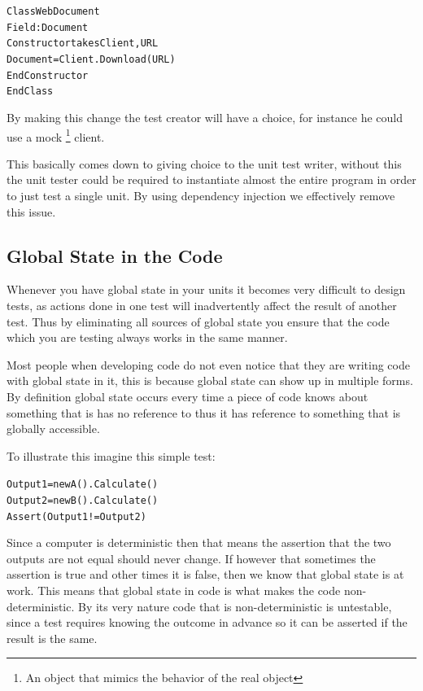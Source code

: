 \begin{alltt}
Class WebDocument
    Field: Document 
    Constructor takes Client, URL 		
        Document = Client.Download(URL) 	
    EndConstructor 
EndClass
\end{alltt}

By making this change the test creator will have a choice, for instance
he could use a mock%
\footnote{An object that mimics the behavior of the real object%
} client. 

This basically comes down to giving choice to the unit test writer,
without this the unit tester could be required to instantiate almost
the entire program in order to just test a single unit. By using dependency
injection we effectively remove this issue.


\subsection{Global State in the Code}

Whenever you have global state in your units it becomes very difficult
to design tests, as actions done in one test will inadvertently affect
the result of another test. Thus by eliminating all sources of global
state you ensure that the code which you are testing always works
in the same manner.

Most people when developing code do not even notice that they are
writing code with global state in it, this is because global state
can show up in multiple forms. By definition global state occurs every
time a piece of code knows about something that is has no reference
to thus it has reference to something that is globally accessible.

To illustrate this imagine this simple test:

\begin{alltt}
Output1 = new A().Calculate() 
Output2 = new B().Calculate() 
Assert(Output1 != Output2)
\end{alltt}

Since a computer is deterministic then that means the assertion that
the two outputs are not equal should never change. If however that
sometimes the assertion is true and other times it is false, then
we know that global state is at work. This means that global state
in code is what makes the code non-deterministic. By its very nature
code that is non-deterministic is untestable, since a test requires
knowing the outcome in advance so it can be asserted if the result
is the same.



